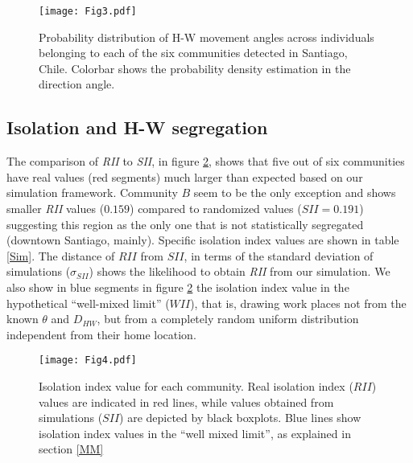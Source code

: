\documentclass[%
preprint,
 amsmath,amssymb,
pra,
]{revtex4-1}
\begin{document}
\begin{figure}
  \centering
      \texttt{[image: Fig3.pdf]}
  \caption{Probability distribution of  H-W movement angles across individuals belonging to each of the six communities detected in Santiago, Chile. Colorbar shows the probability density estimation in the direction angle.}
  \label{histang}
\end{figure}

\subsection{Isolation and H-W segregation}
The comparison of \textit{RII} to \textit{SII}, in figure \ref{isolation}, shows that five out of six communities have real values (red segments) much larger than expected based on our simulation framework. Community $B$ seem to be the only exception and shows smaller \textit{RII} values ($0.159$)  compared to randomized  values ($SII=0.191$) suggesting  this region  as the only one that is not statistically segregated (downtown Santiago, mainly). Specific isolation index values are shown in table \ref{Sim}. The distance of $RII$ from $SII$, in terms of the standard deviation of simulations ($\sigma_{SII}$) shows the likelihood to obtain \textit{RII} from our simulation. We also  show in blue segments in figure \ref{isolation} the isolation index value in the hypothetical ``well-mixed limit'' ($WII$), that is, drawing work places not from the known $\theta$ and $D_{HW}$, but from a completely random uniform  distribution independent from their home location.

\begin{figure}[h!]
  \centering
      \texttt{[image: Fig4.pdf]}
  \caption{Isolation index value for each community. Real isolation index ($RII$) values are indicated in red lines, while values obtained from simulations ($SII$) are depicted by black boxplots. Blue lines show isolation index values in the ``well mixed limit'', as explained in section \ref{MM}}
 \label{isolation}
\end{figure}
\end{document}
